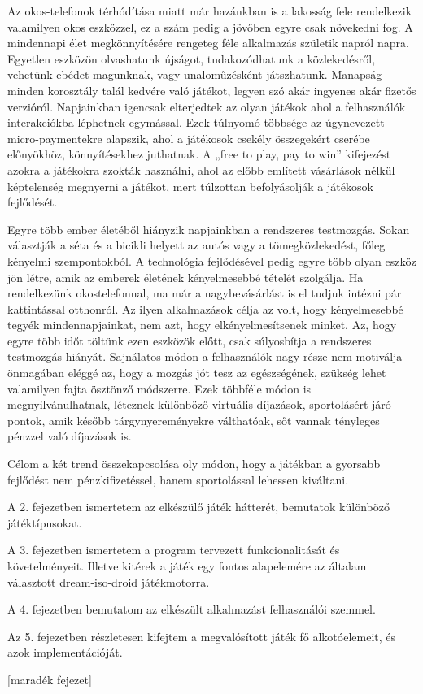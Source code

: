 Az okos-telefonok térhódítása miatt már hazánkban is a lakosság fele rendelkezik valamilyen okos eszközzel, ez a szám pedig a jövőben egyre csak növekedni fog. 
A mindennapi élet megkönnyítésére rengeteg féle alkalmazás születik napról napra. 
Egyetlen eszközön olvashatunk újságot, tudakozódhatunk a közlekedésről, vehetünk ebédet magunknak, vagy unaloműzésként játszhatunk. 
Manapság minden korosztály talál kedvére való játékot, legyen szó akár ingyenes akár fizetős verzióról. 
Napjainkban igencsak elterjedtek az olyan játékok ahol a felhasználók interakciókba léphetnek egymással. 
Ezek túlnyomó többsége az úgynevezett micro-paymentekre alapszik, ahol a játékosok csekély összegekért cserébe előnyökhöz, könnyítésekhez juthatnak. 
A „free to play, pay to win” kifejezést azokra a játékokra szokták használni, ahol az előbb említett vásárlások nélkül képtelenség megnyerni a játékot, mert túlzottan befolyásolják a játékosok fejlődését.

Egyre több ember életéből hiányzik napjainkban a rendszeres testmozgás. 
Sokan választják a séta és a bicikli helyett az autós vagy a tömegközlekedést, főleg kényelmi szempontokból. 
A technológia fejlődésével pedig egyre több olyan eszköz jön létre, amik az emberek életének kényelmesebbé tételét szolgálja. 
Ha rendelkezünk okostelefonnal, ma már a nagybevásárlást is el tudjuk intézni pár kattintással otthonról. 
Az ilyen alkalmazások célja az volt, hogy kényelmesebbé tegyék mindennapjainkat, nem azt, hogy elkényelmesítsenek minket. 
Az, hogy egyre több időt töltünk ezen eszközök előtt, csak súlyosbítja a rendszeres testmozgás hiányát. 
Sajnálatos módon a felhasználók nagy része nem motiválja önmagában eléggé az, hogy a mozgás jót tesz az egészségének, szükség lehet valamilyen fajta ösztönző módszerre. 
Ezek többféle módon is megnyilvánulhatnak, léteznek különböző virtuális díjazások, sportolásért járó pontok, amik később tárgynyereményekre válthatóak, sőt vannak tényleges pénzzel való díjazások is.

Célom a két trend összekapcsolása oly módon, hogy a játékban a gyorsabb fejlődést nem pénzkifizetéssel, hanem sportolással lehessen kiváltani. 

A 2. fejezetben ismertetem az elkészülő játék hátterét, bemutatok különböző játéktípusokat. 

A 3. fejezetben ismertetem a program tervezett funkcionalitását és követelményeit. 
Illetve kitérek a játék egy fontos alapelemére az általam választott dream-iso-droid játékmotorra. 

A 4. fejezetben bemutatom az elkészült alkalmazást felhasználói szemmel. 

Az 5. fejezetben részletesen kifejtem a megvalósított játék fő alkotóelemeit, és azok implementációját. 

[maradék fejezet]
